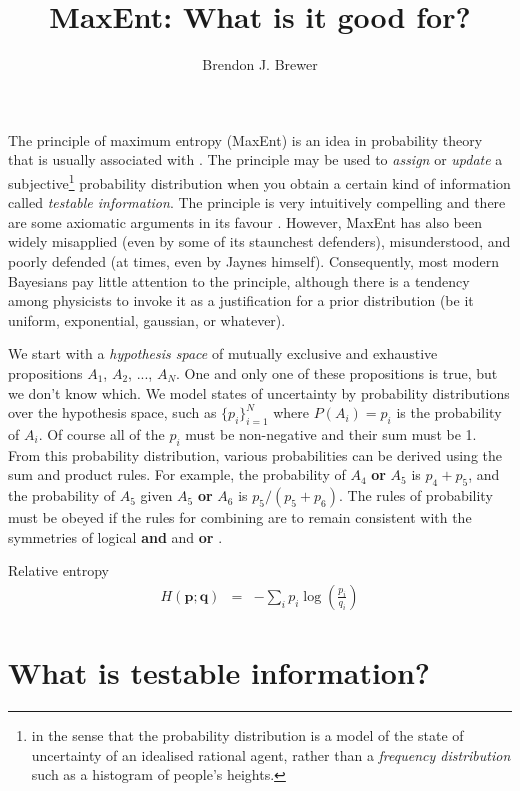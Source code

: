 \documentclass[letterpaper, 11pt]{article}
\title{MaxEnt: What is it good for?}
\author{Brendon J. Brewer}
\begin{document}
\maketitle

The principle of maximum entropy (MaxEnt) is an idea in probability theory
that is usually associated with \citet{jaynes}. The principle may be used
to {\it assign} or {\it update} a
subjective\footnote{in the sense that the probability distribution is a model
of the state of uncertainty of an idealised rational agent, rather than
a {\it frequency distribution} such as a histogram of people's heights.}
probability distribution when you obtain a certain kind of information
called {\it testable information}. The principle is very intuitively compelling
and there are some axiomatic arguments in its favour
\citep[e.g.][]{2010arXiv1008.4831K}. However, MaxEnt has also been widely
misapplied (even by some of its staunchest defenders), misunderstood,
and poorly defended (at times, even by Jaynes himself).
Consequently, most modern Bayesians pay little attention to the principle,
although there is a tendency among physicists to invoke it as a justification
for a prior distribution (be it uniform, exponential, gaussian, or whatever).

We start with a {\it hypothesis space} of mutually exclusive and
exhaustive propositions $A_1$, $A_2$, ..., $A_N$. One and only one of these
propositions is true, but we don't know which. We model states of
uncertainty by probability distributions over the hypothesis space,
such as $\{p_i\}_{i=1}^N$ where $P(A_i) = p_i$ is the probability of $A_i$.
Of course all of the $p_i$ must be non-negative and their sum must be 1.
From this probability distribution, various probabilities can be derived
using the sum and product rules. For example, the probability of
$A_4$ {\bf or} $A_5$ is $p_4 + p_5$, and the probability of $A_5$ given
$A_5$ {\bf or} $A_6$ is $p_5/(p_5 + p_6)$. The rules of probability must
be obeyed if the rules for combining are to remain consistent
with the symmetries of logical {\bf and} and {\bf or} \citep{knuth_skilling}.



Relative entropy
\begin{eqnarray}
H(\boldsymbol{p}; \boldsymbol{q}) &=& -\sum_i p_i \log\left(\frac{p_i}{q_i}\right) 
\end{eqnarray}

\section{What is testable information?}
\end{document}
